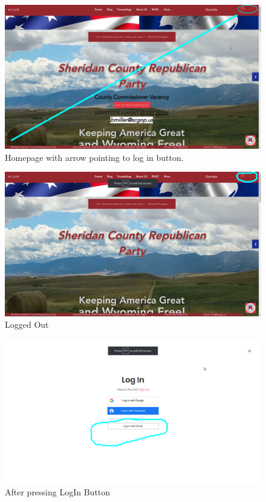 \documentclass{article}
\begin{document}
\begin{figure}[H]
\centering
\includegraphics[scale=0.8]{img/main.png}
\caption{Homepage with arrow pointing to log in button.}
\end{figure}
\begin{figure}[H]
\centering
\includegraphics[scale=0.8]{img/a.png}
\caption{Logged Out}
\end{figure}

\begin{figure}[H]
\centering
\includegraphics[scale=0.8]{img/b.png}
\caption{After pressing LogIn Button}
\end{figure}
\end{document}
